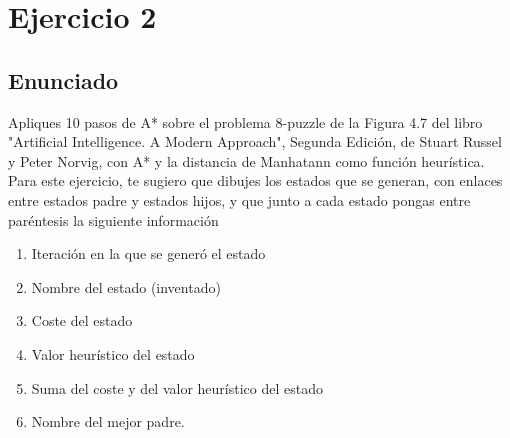 \documentclass[a4paper,10pt]{article}
\begin{document}
\section{Ejercicio 2}
\subsection{Enunciado}
Apliques 10 pasos de A* sobre el problema 8-puzzle de la Figura 4.7 del libro "Artificial Intelligence. A Modern Approach", Segunda Edición, de Stuart Russel y Peter Norvig, con A* y la distancia de Manhatann como función heurística. Para este ejercicio, te sugiero que dibujes los estados que se generan, con enlaces entre estados padre y estados hijos, y que junto a cada estado pongas entre paréntesis la siguiente información
\begin{enumerate}
	\item Iteración en la que se generó el estado
	\item Nombre del estado (inventado)
	\item Coste del estado
	\item Valor heurístico del estado
	\item Suma del coste y del valor heurístico del estado
	\item Nombre del mejor padre.
\end{enumerate}

\end{document}
